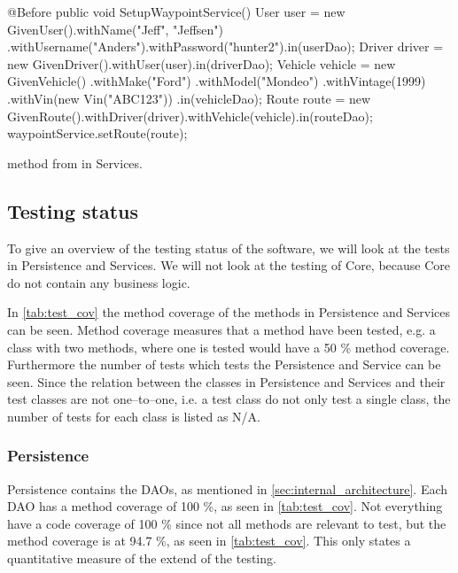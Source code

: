\begin{listing}
    \begin{java2}
        @Before
        public void SetupWaypointService() {
            User user = new GivenUser().withName("Jeff", "Jeffsen")
                .withUsername("Anders").withPassword("hunter2").in(userDao);
            Driver driver = new GivenDriver().withUser(user).in(driverDao);
            Vehicle vehicle = new GivenVehicle()
                .withMake("Ford")
                .withModel("Mondeo")
                .withVintage(1999)
                .withVin(new Vin("ABC123"))
                .in(vehicleDao);
            Route route = new GivenRoute().withDriver(driver).withVehicle(vehicle).in(routeDao);
            waypointService.setRoute(route);
        }
    \end{java2}
    \caption{ method from  in Services.}
    \label{lst:setupwaypointservice}
\end{listing}

\subsection{Testing status}
To give an overview of the testing status of the software, we will look at the tests in Persistence and Services.
We will not look at the testing of Core, because Core do not contain any business logic.

In \cref{tab:test_cov} the method coverage of the methods in Persistence and Services can be seen.
Method coverage measures that a method have been tested, e.g. a class with two methods, where one is tested would have a 50 \% method coverage.
Furthermore the number of tests which tests the Persistence and Service can be seen.
Since the relation between the classes in Persistence and Services and their test classes are not one--to--one, i.e. a test class do not only test a single class,
the number of tests for each class is listed as N/A.


\subsubsection{Persistence}
Persistence contains the \acp{DAO}, as mentioned in \cref{sec:internal_architecture}.
Each \ac{DAO} has a method coverage of 100 \%, as seen in \cref{tab:test_cov}.
Not everything have a code coverage of 100 \% since not all methods are relevant to test, 
but the method coverage is at 94.7 \%, as seen in \cref{tab:test_cov}.
This only states a quantitative measure of the extend of the testing. 

